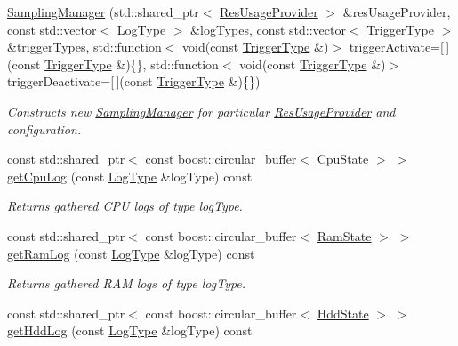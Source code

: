 \begin{DoxyCompactItemize}
\item 
\hyperlink{classSamplingManager_a50a2f50d3c0f34a3881c896d5b5a0939}{Sampling\+Manager} (std\+::shared\+\_\+ptr$<$ \hyperlink{classResUsageProvider}{Res\+Usage\+Provider} $>$ \&res\+Usage\+Provider, const std\+::vector$<$ \hyperlink{structLogType}{Log\+Type} $>$ \&log\+Types, const std\+::vector$<$ \hyperlink{structTriggerType}{Trigger\+Type} $>$ \&trigger\+Types, std\+::function$<$ void(const \hyperlink{structTriggerType}{Trigger\+Type} \&)$>$ trigger\+Activate=\mbox{[}$\,$\mbox{]}(const \hyperlink{structTriggerType}{Trigger\+Type} \&)\{\}, std\+::function$<$ void(const \hyperlink{structTriggerType}{Trigger\+Type} \&)$>$ trigger\+Deactivate=\mbox{[}$\,$\mbox{]}(const \hyperlink{structTriggerType}{Trigger\+Type} \&)\{\})\hypertarget{classSamplingManager_a50a2f50d3c0f34a3881c896d5b5a0939}{}\label{classSamplingManager_a50a2f50d3c0f34a3881c896d5b5a0939}

\begin{DoxyCompactList}\small\item\em Constructs new \hyperlink{classSamplingManager}{Sampling\+Manager} for particular \hyperlink{classResUsageProvider}{Res\+Usage\+Provider} and configuration. \end{DoxyCompactList}\item 
const std\+::shared\+\_\+ptr$<$ const boost\+::circular\+\_\+buffer$<$ \hyperlink{classCpuState}{Cpu\+State} $>$ $>$ \hyperlink{classSamplingManager_a6d2b18b242fb3818c1eb16de17f39041}{get\+Cpu\+Log} (const \hyperlink{structLogType}{Log\+Type} \&log\+Type) const \hypertarget{classSamplingManager_a6d2b18b242fb3818c1eb16de17f39041}{}\label{classSamplingManager_a6d2b18b242fb3818c1eb16de17f39041}

\begin{DoxyCompactList}\small\item\em Returns gathered C\+PU logs of type \textquotesingle{}log\+Type\textquotesingle{}. \end{DoxyCompactList}\item 
const std\+::shared\+\_\+ptr$<$ const boost\+::circular\+\_\+buffer$<$ \hyperlink{classRamState}{Ram\+State} $>$ $>$ \hyperlink{classSamplingManager_aa7324c8b7b910924238d199e8cf0e01c}{get\+Ram\+Log} (const \hyperlink{structLogType}{Log\+Type} \&log\+Type) const \hypertarget{classSamplingManager_aa7324c8b7b910924238d199e8cf0e01c}{}\label{classSamplingManager_aa7324c8b7b910924238d199e8cf0e01c}

\begin{DoxyCompactList}\small\item\em Returns gathered R\+AM logs of type \textquotesingle{}log\+Type\textquotesingle{}. \end{DoxyCompactList}\item 
const std\+::shared\+\_\+ptr$<$ const boost\+::circular\+\_\+buffer$<$ \hyperlink{classHddState}{Hdd\+State} $>$ $>$ \hyperlink{classSamplingManager_a006f202c07785a574ecd104b8c180132}{get\+Hdd\+Log} (const \hyperlink{structLogType}{Log\+Type} \&log\+Type) const \hypertarget{classSamplingManager_a006f202c07785a574ecd104b8c180132}{}\label{classSamplingManager_a006f202c07785a574ecd104b8c180132}


\end{DoxyCompactItemize}
